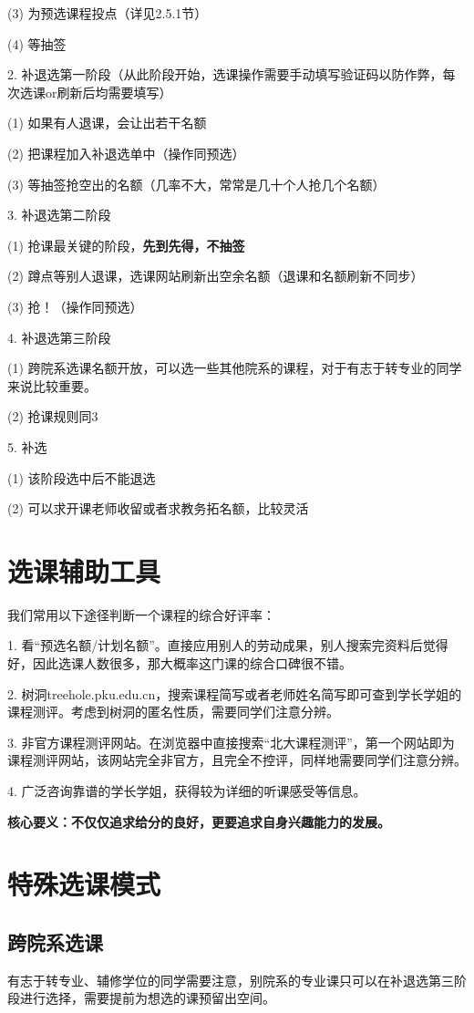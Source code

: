 \documentclass[11pt,oneside]{book}
\begin{document}
(3) 为预选课程投点（详见2.5.1节）

(4) 等抽签

2. 补退选第一阶段（从此阶段开始，选课操作需要手动填写验证码以防作弊，每次选课or刷新后均需要填写）

(1) 如果有人退课，会让出若干名额

(2) 把课程加入补退选单中（操作同预选）

(3) 等抽签抢空出的名额（几率不大，常常是几十个人抢几个名额）

3. 补退选第二阶段

(1) 抢课最关键的阶段，\textbf{\textbf{先到先得，不抽签}}

(2) 蹲点等别人退课，选课网站刷新出空余名额（退课和名额刷新不同步）

(3) 抢！（操作同预选）

4. 补退选第三阶段

(1) 跨院系选课名额开放，可以选一些其他院系的课程，对于有志于转专业的同学来说比较重要。

(2) 抢课规则同3

5. 补选

(1) 该阶段选中后不能退选

(2) 可以求开课老师收留或者求教务拓名额，比较灵活



\section{选课辅助工具}
我们常用以下途径判断一个课程的综合好评率：

1. 看“预选名额/计划名额”。直接应用别人的劳动成果，别人搜索完资料后觉得好，因此选课人数很多，那大概率这门课的综合口碑很不错。

2. 树洞treehole.pku.edu.cn，搜索课程简写或者老师姓名简写即可查到学长学姐的课程测评。考虑到树洞的匿名性质，需要同学们注意分辨。

3. 非官方课程测评网站。在浏览器中直接搜索“北大课程测评”，第一个网站即为课程测评网站，该网站完全非官方，且完全不控评，同样地需要同学们注意分辨。

4. 广泛咨询靠谱的学长学姐，获得较为详细的听课感受等信息。

\textbf{核心要义：不仅仅追求给分的良好，更要追求自身兴趣能力的发展。}

\section{特殊选课模式}
\subsection{跨院系选课}
有志于转专业、辅修学位的同学需要注意，别院系的专业课只可以在补退选第三阶段进行选择，需要提前为想选的课预留出空间。
\end{document}
